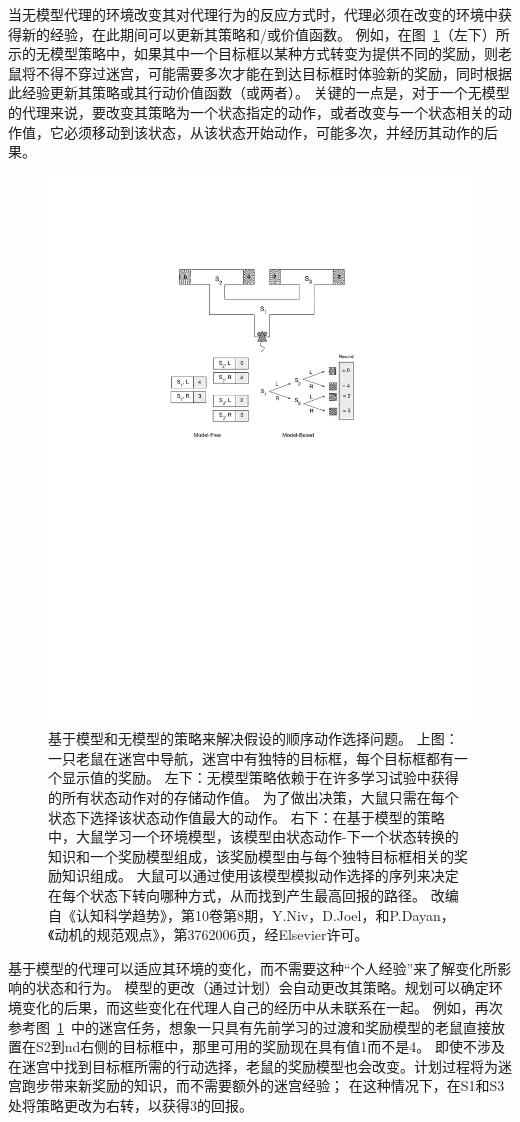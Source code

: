 {{{{{{{{{{{{{当无模型代理的环境改变其对代理行为的反应方式时，代理必须在改变的环境中获得新的经验，在此期间可以更新其策略和/或价值函数。
例如，在图~\ref{fig:11_8}（左下）所示的无模型策略中，如果其中一个目标框以某种方式转变为提供不同的奖励，则老鼠将不得不穿过迷宫，可能需要多次才能在到达目标框时体验新的奖励，同时根据此经验更新其策略或其行动价值函数（或两者）。
关键的一点是，对于一个无模型的代理来说，要改变其策略为一个状态指定的动作，或者改变与一个状态相关的动作值，它必须移动到该状态，从该状态开始动作，可能多次，并经历其动作的后果。


\begin{figure}[!htb]
	\centering
	\includegraphics[width=0.65\linewidth]{chap11/fig_11_8}
	\caption{基于模型和无模型的策略来解决假设的顺序动作选择问题。
		上图：一只老鼠在迷宫中导航，迷宫中有独特的目标框，每个目标框都有一个显示值的奖励。
		左下：无模型策略依赖于在许多学习试验中获得的所有状态动作对的存储动作值。
		为了做出决策，大鼠只需在每个状态下选择该状态动作值最大的动作。
		右下：在基于模型的策略中，大鼠学习一个环境模型，该模型由状态动作-下一个状态转换的知识和一个奖励模型组成，该奖励模型由与每个独特目标框相关的奖励知识组成。
		大鼠可以通过使用该模型模拟动作选择的序列来决定在每个状态下转向哪种方式，从而找到产生最高回报的路径。
		改编自《认知科学趋势》，第10卷第8期，Y.Niv，D.Joel，和P.Dayan，《动机的规范观点》，第3762006页，经Elsevier许可。  \label{fig:11_8}}
\end{figure}


基于模型的代理可以适应其环境的变化，而不需要这种“个人经验”来了解变化所影响的状态和行为。
模型的更改（通过计划）会自动更改其策略。规划可以确定环境变化的后果，而这些变化在代理人自己的经历中从未联系在一起。
例如，再次参考图~\ref{fig:11_8}~中的迷宫任务，想象一只具有先前学习的过渡和奖励模型的老鼠直接放置在S2到nd右侧的目标框中，那里可用的奖励现在具有值1而不是4。
即使不涉及在迷宫中找到目标框所需的行动选择，老鼠的奖励模型也会改变。计划过程将为迷宫跑步带来新奖励的知识，而不需要额外的迷宫经验；
在这种情况下，在S1和S3处将策略更改为右转，以获得3的回报。


}}}}}}}}}}}}}
